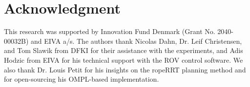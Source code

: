 \documentclass[letterpaper, 10 pt, conference]{ieeetran}  %
\begin{document}

\IEEEpeerreviewmaketitle






 
 

%

\section*{Acknowledgment}
This research was supported by Innovation Fund Denmark (Grant No. 2040-00032B) and EIVA a/s. The authors thank Nicolas Dahn, Dr. Leif Christensen, and Tom Slawik from DFKI for their assistance with the experiments, and Adis Hodzic from EIVA for his technical support with the ROV control software. We also thank Dr. Louis Petit for his insights on the ropeRRT planning method and for open-sourcing his OMPL-based implementation.




%
\end{document}

